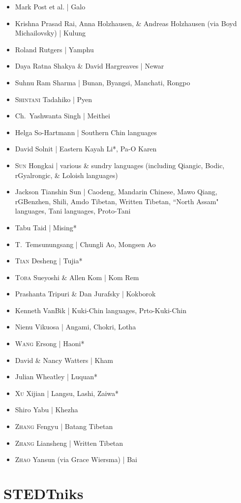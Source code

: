 \begin{itemize}
\item Mark Post et al. | Galo
\item Krishna Prasad Rai, Anna Holzhausen, \& Andreas Holzhausen (via Boyd Michailovsky) | Kulung
\item Roland Rutgers | Yamphu
\item Daya Ratna Shakya \& David Hargreaves | Newar
\item Suhnu Ram Sharma | Bunan, Byangsi, Manchati, Rongpo
\item \textsc{Shintani} Tadahiko | Pyen
\item Ch.\ Yashwanta Singh | Meithei
\item Helga So-Hartmann | Southern Chin languages
\item David Solnit | Eastern Kayah Li*, Pa-O Karen
\item \textsc{Sun} Hongkai | various \& sundry languages (including Qiangic, Bodic, rGyalrongic, \& Loloish languages)
\item Jackson Tianshin Sun | Caodeng, Mandarin Chinese, Mawo Qiang, rGBenzhen, Shili, Amdo Tibetan, Written Tibetan, ``North Assam" languages, Tani languages, Proto-Tani
\item Tabu Taid | Mising*
\item T.\ Temsunungsang | Chungli Ao, Mongsen Ao
\item \textsc{Tian} Desheng | Tujia*
\item \textsc{Toba} Sueyoshi \& Allen Kom | Kom Rem
\item Prashanta Tripuri \& Dan Jurafsky | Kokborok
\item Kenneth VanBik | Kuki-Chin languages, Prto-Kuki-Chin
\item Nienu Vikuosa | Angami, Chokri, Lotha
\item \textsc{Wang} Ersong | Haoni*
\item David \& Nancy Watters | Kham
\item Julian Wheatley | Luquan*
\item \textsc{Xu} Xijian | Langsu, Lashi, Zaiwa*
\item Shiro Yabu | Khezha
\item \textsc{Zhang} Fengyu | Batang Tibetan
\item \textsc{Zhang} Liansheng | Written Tibetan
\item \textsc{Zhao} Yansun (via Grace Wiersma) | Bai
\end{itemize}


\section{STEDTniks}

